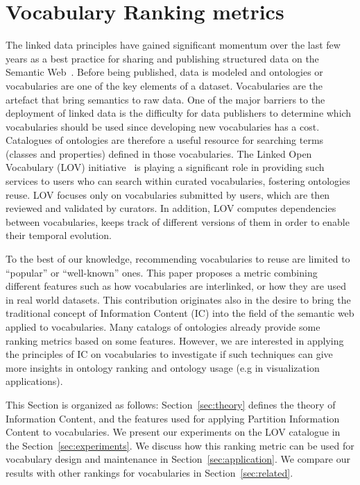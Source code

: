 \section{Vocabulary Ranking metrics}
\label{sec:vocabranking}

\label{sec:introduction}
The linked data principles have gained significant momentum over the last few years as a best practice for sharing and publishing structured data on the Semantic Web~\cite{Bizer2009}. Before being published, data is modeled and ontologies or vocabularies are one of the key elements of a dataset. Vocabularies are the artefact that bring semantics to raw data. One of the major barriers to the deployment of linked data is the difficulty for data publishers to determine which vocabularies should be used since developing new vocabularies has a cost. Catalogues of ontologies are therefore a useful resource for searching terms (classes and properties) defined in those vocabularies. The Linked Open Vocabulary (LOV) initiative~\cite{scharffe_2012} is playing a significant role in providing such services to users who can search within curated vocabularies, fostering ontologies reuse. LOV focuses only on vocabularies submitted by users, which are then reviewed and validated by curators. In addition, LOV computes dependencies between vocabularies, keeps track of different versions of them in order to enable their temporal evolution.

To the best of our knowledge, recommending vocabularies to reuse are limited to ``popular'' or ``well-known'' ones. This paper proposes a metric combining different features such as how vocabularies are interlinked, or how they are used in real world datasets. This contribution originates also in the desire to bring the traditional concept of Information Content (IC) into the field of the semantic web applied to vocabularies. Many catalogs of ontologies already provide some ranking metrics based on some features. However, we are interested in applying the principles of IC on vocabularies to investigate if such techniques can give more insights in ontology ranking and ontology usage (e.g in visualization applications).

This Section is organized as follows: Section~\ref{sec:theory} defines the theory of Information Content, and the features used for applying Partition Information Content to vocabularies. We present our experiments on the LOV catalogue in the Section~\ref{sec:experiments}. We discuss how this ranking metric can be used for vocabulary design and maintenance in Section~\ref{sec:application}. We compare our results with other rankings for vocabularies in Section~\ref{sec:related}.



